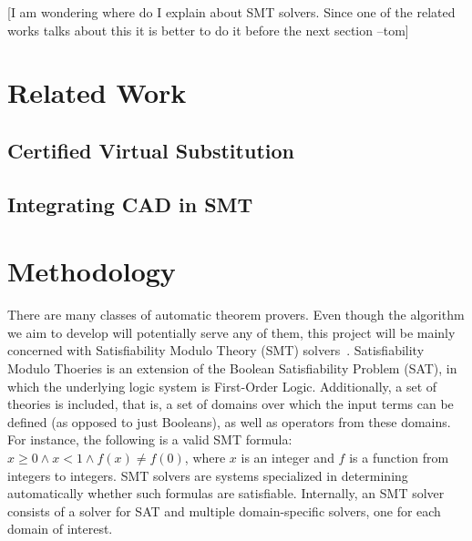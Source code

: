 \documentclass[a4paper, 12pt]{article}
\newcommand{\yell}[1]{{\color{blue} [#1]}}
\newcommand{\tom}[1]{\yell{#1 --tom}}
\begin{document}
\tom{I am wondering where do I explain about SMT solvers. Since one of the related works
talks about this it is better to do it before the next section}

\section{Related Work}

\subsection{Certified Virtual Substitution}

\subsection{Integrating CAD in SMT}

\section{Methodology}
\label{sec:methodology}

There are many classes of automatic theorem provers. Even though the algorithm we aim
to develop will potentially serve any of them, this project will be mainly concerned with
Satisfiability Modulo Theory (SMT) solvers~\cite{smtbook}. Satisfiability Modulo Thoeries
is an extension of the Boolean Satisfiability Problem (SAT), in which the underlying logic
system is First-Order Logic. Additionally, a set of theories is included, that is,
a set of domains over which the input terms can be defined (as opposed to just Booleans),
as well as operators from these domains. For instance, the following is a valid SMT formula:
$x \ge 0 \wedge x < 1 \wedge f(x) \neq f(0)$, where $x$ is an integer and $f$ is a
function from integers to integers. SMT solvers are systems specialized in determining
automatically whether such formulas are satisfiable. Internally, an SMT solver
consists of a solver for SAT and multiple domain-specific solvers, one for each domain of
interest.


\end{document}
